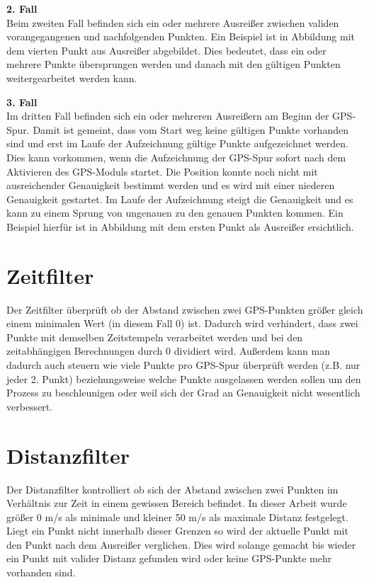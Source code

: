\textbf{2. Fall}\\
Beim zweiten Fall befinden sich ein oder mehrere Ausreißer zwischen validen vorangegangenen und nachfolgenden Punkten. Ein Beispiel ist in Abbildung  mit dem vierten Punkt aus Ausreißer abgebildet. Dies bedeutet, dass ein oder mehrere Punkte übersprungen werden und danach mit den gültigen Punkten weitergearbeitet werden kann.


\textbf{3. Fall}\\
Im dritten Fall befinden sich ein oder mehreren Ausreißern am Beginn der GPS-Spur. Damit ist gemeint, dass vom Start weg keine gültigen Punkte vorhanden sind und erst im Laufe der Aufzeichnung gültige Punkte aufgezeichnet werden. Dies kann vorkommen, wenn die Aufzeichnung der GPS-Spur sofort nach dem Aktivieren des GPS-Moduls startet. Die Position konnte noch nicht mit ausreichender Genauigkeit bestimmt werden und es wird mit einer niederen Genauigkeit gestartet. Im Laufe der Aufzeichnung steigt die Genauigkeit und es kann zu einem Sprung von ungenauen zu den genauen Punkten kommen. Ein Beispiel hierfür ist in Abbildung  mit dem ersten Punkt als Ausreißer ersichtlich.



\section{Zeitfilter}
Der Zeitfilter überprüft ob der Abstand zwischen zwei GPS-Punkten größer gleich einem minimalen Wert (in diesem Fall 0) ist. Dadurch wird verhindert, dass zwei Punkte mit demselben Zeitstempeln verarbeitet werden und bei den zeitabhängigen Berechnungen durch 0 dividiert wird. Außerdem kann man dadurch auch steuern wie viele Punkte pro GPS-Spur überprüft werden  (z.B. nur jeder 2. Punkt) beziehungsweise welche Punkte ausgelassen werden sollen um den Prozess zu beschleunigen oder weil sich der Grad an Genauigkeit nicht wesentlich verbessert.

\section{Distanzfilter}
Der Distanzfilter kontrolliert ob sich der Abstand zwischen zwei Punkten im Verhältnis zur Zeit in einem gewissen Bereich befindet. In dieser Arbeit wurde größer 0 m/s als minimale und kleiner 50 m/s als maximale Distanz festgelegt. Liegt ein Punkt nicht innerhalb dieser Grenzen so wird der aktuelle Punkt mit den Punkt nach dem Ausreißer verglichen. Dies wird solange gemacht bis wieder ein Punkt mit valider Distanz gefunden wird oder keine GPS-Punkte mehr vorhanden sind.


